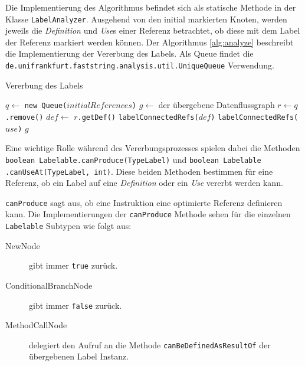 Die Implementierung des Algorithmus befindet sich als statische Methode in der Klasse 
\texttt{LabelAnalyzer}. Ausgehend von den initial markierten Knoten, werden jeweils die 
\textit{Definition} und \textit{Use}s einer Referenz betrachtet, ob diese mit dem Label der Referenz 
markiert werden können. Der Algorithmus \ref{alg:analyze} beschreibt die Implementierung 
der Vererbung des Labels. Als Queue findet die 
\texttt{de.unifrankfurt.faststring.analysis.util.UniqueQueue} Verwendung.

\begin{algorithm}[H]
	\caption{Vererbung des Labels}\label{alg:analyze}
	\begin{algorithmic}[1]
		\STATE $q \gets$ \texttt{new Queue($initialReferences$)}
		\STATE $g \gets$ der übergebene Datenflussgraph
			\STATE $r \gets q$\texttt{.remove()}
				\STATE $def \gets$ \texttt{$r$.getDef()}
					\STATE \texttt{labelConnectedRefs($def$)}
				\ENDIF
						\STATE \texttt{labelConnectedRefs($use$)}
					\ENDIF
				\ENDFOR
			\ENDIF
		\ENDWHILE
		\RETURN $g$
	\end{algorithmic}
\end{algorithm}

Eine wichtige Rolle während des Vererbungsprozesses spielen dabei die Methoden 
\texttt{boolean Labelable.canProduce(TypeLabel)} und
\texttt{boolean Labelable\\.canUseAt(TypeLabel, int)}. Diese beiden Methoden bestimmen 
für eine Referenz, ob ein Label auf eine \textit{Definition} oder ein \textit{Use} vererbt werden kann.

\texttt{canProduce} sagt aus, ob eine Instruktion eine optimierte Referenz definieren kann. 
Die Implementierungen der \texttt{canProduce} Methode sehen für die einzelnen \texttt{Labelable}
Subtypen wie folgt aus:

\begin{description}
	\item[NewNode] gibt immer \texttt{true} zurück.
	\item[ConditionalBranchNode] gibt immer \texttt{false} zurück.
	\item[MethodCallNode] delegiert den Aufruf an die Methode \texttt{canBeDefinedAsResultOf} der
	übergebenen Label Instanz.
\end{description}

